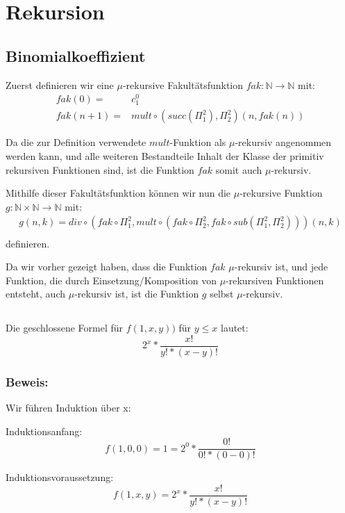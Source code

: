 \documentclass[10pt,leqno ]{article}
\begin{document}
\section{Rekursion}
\subsection{Binomialkoeffizient}
Zuerst definieren wir eine $\mu$-rekursive Fakultätsfunktion $fak: \mathbb{N} \rightarrow \mathbb{N}$ mit:
\begin{align*}
    fak(0) =& c^0_1 \\
    fak(n+1) =& mult \circ (succ(\Pi^2_1), \Pi^2_2)(n, fak(n))
\end{align*}

Da die zur Definition verwendete $mult$-Funktion als $\mu$-rekursiv angenommen werden kann, und alle weiteren Bestandteile Inhalt der Klasse der primitiv rekursiven Funktionen sind, ist die Funktion $fak$ somit auch $\mu$-rekursiv.

Mithilfe dieser Fakultätsfunktion können wir nun die $\mu$-rekursive Funktion $g: \mathbb{N} \times \mathbb{N} \rightarrow \mathbb{N}$ mit: 
\begin{align*}
    g(n,k) = div \circ (fak \circ \Pi^2_1, mult \circ (fak \circ \Pi^2_2, fak \circ sub(\Pi^2_1, \Pi^2_2))) (n,k) \\
\end{align*}
definieren.

Da wir vorher gezeigt haben, dass die Funktion $fak$ $\mu$-rekursiv ist, und jede Funktion, die durch Einsetzung/Komposition von $\mu$-rekursiven Funktionen entsteht, auch $\mu$-rekursiv ist, ist die Funktion $g$ selbst $\mu$-rekursiv.


\subsection{}
Die geschlossene Formel für $f(1,x,y))$ für $y \le x$ lautet: 
\[ 2^x * \frac{x!}{y! * (x - y)!} \]

\subsubsection*{Beweis:}
Wir führen Induktion über x:

Induktionsanfang:
\begin{equation*}
f(1,0,0) = 1 = 2^0 * \frac{0!}{0! * (0-0)!}
\end{equation*}

Induktionsvoraussetzung:
\begin{equation*}
f(1,x,y) = 2^x * \frac{x!}{y! * (x - y)!}
\end{equation*}
\end{document}
